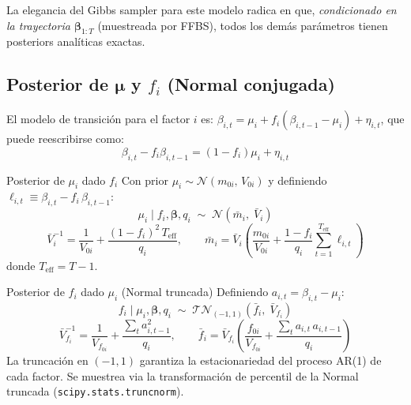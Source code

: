 \documentclass[12pt, a4paper]{article}
\theoremstyle{plain}
\theoremstyle{definition}
\theoremstyle{remark}
\newcommand{\bbet}{\bm{\beta}}
\newcommand{\bmu}{\bm{\mu}}
\newcommand{\N}{\mathcal{N}}
\newcommand{\TN}{\mathcal{TN}}
\begin{document}
La elegancia del Gibbs sampler para este modelo radica en que,
\emph{condicionado en la trayectoria $\bbet_{1:T}$} (muestreada por FFBS),
todos los demás parámetros tienen posteriors analíticas exactas.

\subsection[Posterior de $\mu_i$ y $f_i$ (Normal conjugada)]{Posterior de $\bmu$ y $f_i$ (Normal conjugada)}

El modelo de transición para el factor $i$ es:
$\beta_{i,t} = \mu_i + f_i(\beta_{i,t-1} - \mu_i) + \eta_{i,t}$,
que puede reescribirse como:
\begin{equation}
  \beta_{i,t} - f_i\beta_{i,t-1} = (1 - f_i)\mu_i + \eta_{i,t}
\end{equation}

\begin{teoremabox}{Posterior de $\mu_i$ dado $f_i$}
Con prior $\mu_i \sim \N(m_{0i},\, V_{0i})$ y definiendo
$\ell_{i,t} \equiv \beta_{i,t} - f_i\,\beta_{i,t-1}$:
\begin{equation}
  \mu_i \mid f_i, \bbet, q_i \;\sim\;
  \N\!\left(\bar{m}_i,\; \bar{V}_i\right)
\end{equation}
\begin{equation}
  \bar{V}_i^{-1} = \frac{1}{V_{0i}} + \frac{(1-f_i)^2\,T_\text{eff}}{q_i},
  \qquad
  \bar{m}_i = \bar{V}_i\!\left(\frac{m_{0i}}{V_{0i}}
    + \frac{1-f_i}{q_i}\sum_{t=1}^{T_\text{eff}}\ell_{i,t}\right)
  \label{eq:post_mu}
\end{equation}
donde $T_\text{eff} = T - 1$.
\end{teoremabox}

\begin{teoremabox}{Posterior de $f_i$ dado $\mu_i$ (Normal truncada)}
Definiendo $a_{i,t} = \beta_{i,t} - \mu_i$:
\begin{equation}
  f_i \mid \mu_i, \bbet, q_i \;\sim\;
  \TN_{(-1,1)}\!\left(\bar{f}_i,\; \bar{V}_{f_i}\right)
\end{equation}
\begin{equation}
  \bar{V}_{f_i}^{-1} = \frac{1}{V_{f_{0i}}} + \frac{\sum_t a_{i,t-1}^2}{q_i},
  \qquad
  \bar{f}_i = \bar{V}_{f_i}\!\left(\frac{f_{0i}}{V_{f_{0i}}}
    + \frac{\sum_t a_{i,t}\,a_{i,t-1}}{q_i}\right)
  \label{eq:post_f}
\end{equation}
La truncación en $(-1, 1)$ garantiza la estacionariedad del proceso AR(1)
de cada factor. Se muestrea via la transformación de percentil de la
Normal truncada (\texttt{scipy.stats.truncnorm}).
\end{teoremabox}
\end{document}
